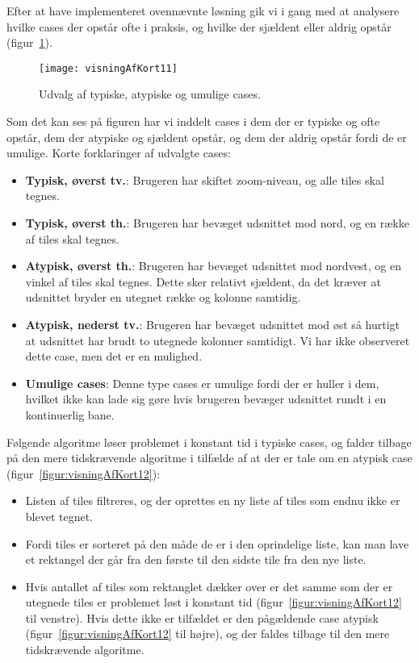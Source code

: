 Efter at have implementeret ovennævnte løsning gik vi i gang med at analysere hvilke cases der opstår ofte i praksis, og hvilke der sjældent eller aldrig opstår (figur~\ref{figur:visningAfKort11}).

\begin{figure}[h]
	\centering
	\texttt{[image: visningAfKort11]}
	\captionsetup{width=0.8\textwidth}
	\caption{Udvalg af typiske, atypiske og umulige cases.}
	\label{figur:visningAfKort11}
\end{figure}

Som det kan ses på figuren har vi inddelt cases i dem der er typiske og ofte opstår, dem der atypiske og sjældent opstår, og dem der aldrig opstår fordi de er umulige. Korte forklaringer af udvalgte cases:

\begin{itemize}
	\item \textbf{Typisk, øverst tv.}: Brugeren har skiftet zoom-niveau, og alle tiles skal tegnes.
	\item \textbf{Typisk, øverst th.}: Brugeren har bevæget udsnittet mod nord, og en række af tiles skal tegnes.
	\item \textbf{Atypisk, øverst th.}: Brugeren har bevæget udsnittet mod nordvest, og en vinkel af tiles skal tegnes. Dette sker relativt sjældent, da det kræver at udsnittet bryder en utegnet række og kolonne samtidig.
	\item \textbf{Atypisk, nederst tv.}: Brugeren har bevæget udsnittet mod øst så hurtigt at udsnittet har brudt to utegnede kolonner samtidigt. Vi har ikke observeret dette case, men det er en mulighed.
	\item \textbf{Umulige cases}: Denne type cases er umulige fordi der er huller i dem, hvilket ikke kan lade sig gøre hvis brugeren bevæger udsnittet rundt i en kontinuerlig bane.
\end{itemize}

Følgende algoritme løser problemet i konstant tid i typiske cases, og falder tilbage på den mere tidskrævende algoritme i tilfælde af at der er tale om en atypisk case (figur~\ref{figur:visningAfKort12}):

\begin{itemize}
	\item Listen af tiles filtreres, og der oprettes en ny liste af tiles som endnu ikke er blevet tegnet.
	\item Fordi tiles er sorteret på den måde de er i den oprindelige liste, kan man lave et rektangel der går fra den første til den sidste tile fra den nye liste.
	\item Hvis antallet af tiles som rektanglet dækker over er det samme som der er utegnede tiles er problemet løst i konstant tid (figur~\ref{figur:visningAfKort12} til venstre). Hvis dette ikke er tilfældet er den pågældende case atypisk (figur~\ref{figur:visningAfKort12} til højre), og der faldes tilbage til den mere tidskrævende algoritme.
\end{itemize}

